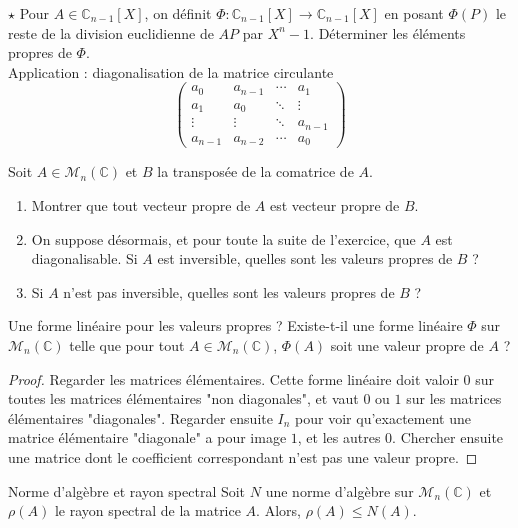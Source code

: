 \documentclass[french,a4paper]{article}
\newcommand{\C}{\mathbb{C}}
\theoremstyle{plain}
\theoremstyle{definition}
\theoremstyle{remark}
\begin{document}
\begin{ex}{$\star$}
	Pour $A\in\C_{n-1}[X]$, on définit $\Phi:\C_{n-1}[X]\to\C_{n-1}[X]$ en posant $\Phi(P)$ le reste de la division euclidienne de $AP$ par $X^n-1$. Déterminer les éléments propres de $\Phi$. \\
	Application : diagonalisation de la matrice circulante $$\begin{pmatrix}
		a_0&a_{n-1}&\cdots&a_1\\
		a_1&a_0&\ddots&\vdots\\
		\vdots&\vdots&\ddots&a_{n-1}\\
		a_{n-1}&a_{n-2}&\cdots&a_0
	\end{pmatrix}$$
\end{ex}

\begin{ex}{}
	Soit $A\in\mathcal{M}_n(\C)$ et $B$ la transposée de la comatrice de $A$.
	\begin{enumerate}
		\item Montrer que tout vecteur propre de $A$ est vecteur propre de $B$.
		\item On suppose désormais, et pour toute la suite de l'exercice, que $A$ est diagonalisable. Si $A$ est inversible, quelles sont les valeurs propres de $B$ ?
		\item Si $A$ n'est pas inversible, quelles sont les valeurs propres de $B$ ?
	\end{enumerate}
\end{ex}

\begin{ex}{Une forme linéaire pour les valeurs propres ?}
	Existe-t-il une forme linéaire $\Phi$ sur $\mathcal{M}_n(\C)$ telle que pour tout $A\in\mathcal{M}_n(\C)$, $\Phi(A)$ soit une valeur propre de $A$ ?
\end{ex}
\begin{proof}
	Regarder les matrices élémentaires. Cette forme linéaire doit valoir $0$ sur toutes les matrices élémentaires "non diagonales", et vaut $0$ ou $1$ sur les matrices élémentaires "diagonales". Regarder ensuite $I_n$ pour voir qu'exactement une matrice élémentaire "diagonale" a pour image $1$, et les autres $0$. Chercher ensuite une matrice dont le coefficient correspondant n'est pas une valeur propre.
\end{proof}

\begin{ex}{Norme d'algèbre et rayon spectral}
	Soit $N$ une norme d'algèbre sur $\mathcal{M}_n(\C)$ et $\rho(A)$ le rayon spectral de la matrice $A$. Alors, $\rho(A)\leqslant N(A)$.
\end{ex}
\end{document}
